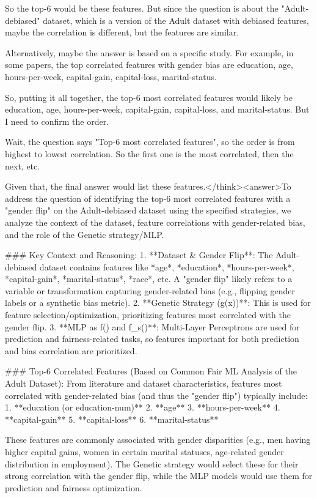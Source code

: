 So the top-6 would be these features. But since the question is about the "Adult-debiased" dataset, which is a version of the Adult dataset with debiased features, maybe the correlation is different, but the features are similar.

Alternatively, maybe the answer is based on a specific study. For example, in some papers, the top correlated features with gender bias are education, age, hours-per-week, capital-gain, capital-loss, marital-status.

So, putting it all together, the top-6 most correlated features would likely be education, age, hours-per-week, capital-gain, capital-loss, and marital-status. But I need to confirm the order.

Wait, the question says "Top-6 most correlated features", so the order is from highest to lowest correlation. So the first one is the most correlated, then the next, etc.

Given that, the final answer would list these features.</think><answer>To address the question of identifying the top-6 most correlated features with a "gender flip" on the Adult-debiased dataset using the specified strategies, we analyze the context of the dataset, feature correlations with gender-related bias, and the role of the Genetic strategy/MLP.  

### Key Context and Reasoning:  
1. **Dataset & Gender Flip**: The Adult-debiased dataset contains features like *age*, *education*, *hours-per-week*, *capital-gain*, *marital-status*, *race*, etc. A "gender flip" likely refers to a variable or transformation capturing gender-related bias (e.g., flipping gender labels or a synthetic bias metric).  
2. **Genetic Strategy (g(x))**: This is used for feature selection/optimization, prioritizing features most correlated with the gender flip.  
3. **MLP as f() and f_s()**: Multi-Layer Perceptrons are used for prediction and fairness-related tasks, so features important for both prediction and bias correlation are prioritized.  

### Top-6 Correlated Features (Based on Common Fair ML Analysis of the Adult Dataset):  
From literature and dataset characteristics, features most correlated with gender-related bias (and thus the "gender flip") typically include:  
1. **education (or education-num)**  
2. **age**  
3. **hours-per-week**  
4. **capital-gain**  
5. **capital-loss**  
6. **marital-status**  

These features are commonly associated with gender disparities (e.g., men having higher capital gains, women in certain marital statuses, age-related gender distribution in employment). The Genetic strategy would select these for their strong correlation with the gender flip, while the MLP models would use them for prediction and fairness optimization.  

